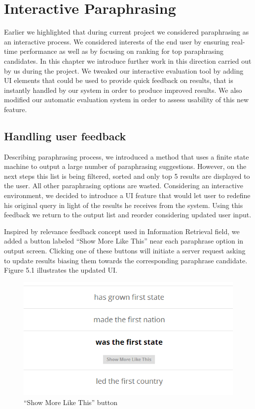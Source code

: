 
\chapter{Interactive Paraphrasing}

Earlier we highlighted that during current project we considered paraphrasing as an interactive process. We considered interests of the end user by ensuring real-time performance as well as by focusing on ranking for top paraphrasing candidates. In this chapter we introduce further work in this direction carried out by us during the project. We tweaked our interactive evaluation tool by adding UI elements that could be used to provide quick feedback on results, that is instantly handled by our system in order to produce improved results. We also modified our automatic evaluation system in order to assess usability of this new feature.

\section{Handling user feedback}

Describing paraphrasing process, we introduced a method that uses a finite state machine to output a large number of paraphrasing suggestions. However, on the next steps this list is being filtered, sorted and only top 5 results are displayed to the user. All other paraphrasing options are wasted. Considering an interactive environment, we decided to introduce a UI feature that would let user to redefine his original query in light of the results he receives from the system. Using this feedback we return to the output list and reorder considering updated user input. 

Inspired by relevance feedback concept used in Information Retrieval field, we added a button labeled ``Show More Like This'' near each paraphrase option in output screen. Clicking one of these buttons will initiate a server request asking to update results biasing them towards the corresponding paraphrase candidate. Figure 5.1 illustrates the updated UI. 


\begin{figure}
 \centering 
 \includegraphics[scale=0.8]{g/show-more-like-this.png}
 \caption{``Show More Like This'' button}
\end{figure}

